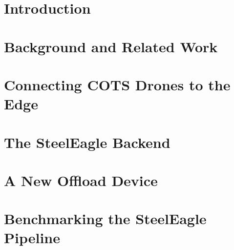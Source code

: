 \documentclass[12pt]{cmuthesis}
\begin{document}
\chapter{Introduction}

\chapter{Background and Related Work}

\chapter{Connecting COTS Drones to the Edge}

\chapter{The SteelEagle Backend}

\chapter{A New Offload Device}

\chapter{Benchmarking the SteelEagle Pipeline}


%

\backmatter


\renewcommand{\bibsection}{\chapter{\bibname}}

\end{document}
